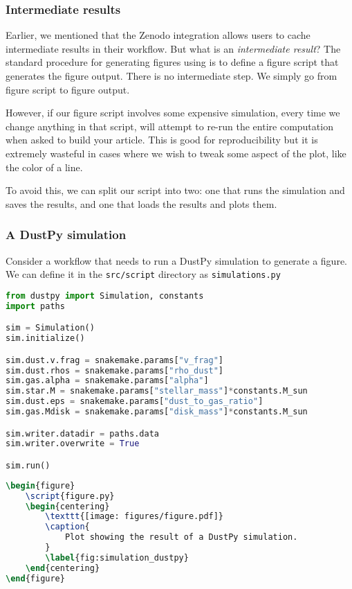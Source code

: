 \documentclass{aa}
\begin{document}
\subsubsection{Intermediate results}

Earlier, we mentioned that the Zenodo integration allows users to cache intermediate results in their workflow.
But what is an \textit{intermediate result}?
The standard procedure for generating figures using \showyourwork is to define a figure script that generates the figure output.
There is no intermediate step. We simply go from figure script to figure output.

However, if our figure script involves some expensive simulation, every time we change anything in that script, \showyourwork will attempt to re-run the entire computation when asked to build your article.
This is good for reproducibility but it is extremely wasteful in cases where we wish to tweak some aspect of the plot, like the color of a line.

To avoid this, we can split our script into two: one that runs the simulation and saves the results, and one that loads the results and plots them.

\subsubsection{A DustPy simulation}

Consider a workflow that needs to run a DustPy simulation to generate a figure.
We can define it in the \texttt{src/script} directory as \texttt{simulations.py}

\begin{lstlisting}[language=python]
from dustpy import Simulation, constants
import paths

sim = Simulation()
sim.initialize()

sim.dust.v.frag = snakemake.params["v_frag"]
sim.dust.rhos = snakemake.params["rho_dust"]
sim.gas.alpha = snakemake.params["alpha"]
sim.star.M = snakemake.params["stellar_mass"]*constants.M_sun
sim.dust.eps = snakemake.params["dust_to_gas_ratio"]
sim.gas.Mdisk = snakemake.params["disk_mass"]*constants.M_sun

sim.writer.datadir = paths.data
sim.writer.overwrite = True

sim.run()
\end{lstlisting}

\begin{lstlisting}[language=TeX]
\begin{figure}
    \script{figure.py}
    \begin{centering}
        \texttt{[image: figures/figure.pdf]}
        \caption{
            Plot showing the result of a DustPy simulation.
        }
        \label{fig:simulation_dustpy}
    \end{centering}
\end{figure}
\end{lstlisting}
\end{document}

